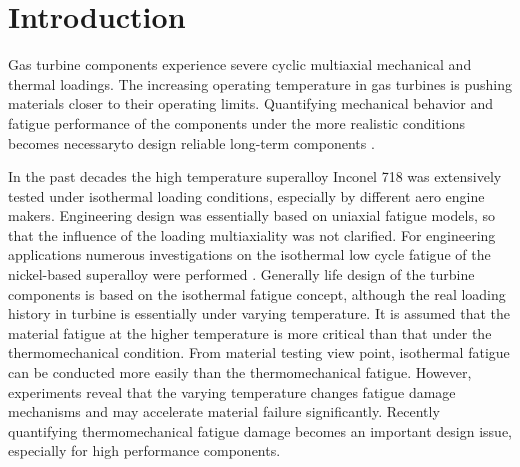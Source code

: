 

\section{Introduction}
\noindent
Gas turbine components experience severe cyclic multiaxial mechanical and thermal loadings. The increasing operating temperature in gas turbines is pushing materials closer to their operating limits. Quantifying mechanical behavior and fatigue performance of the components under the more realistic conditions becomes necessaryto design reliable long-term components  \cite{Harrison1996}.

In the past decades the high temperature superalloy Inconel 718 was extensively tested under isothermal loading conditions, especially by different aero engine makers. Engineering design was essentially based on uniaxial fatigue models, so that the influence of the loading multiaxiality was not clarified.
For engineering applications numerous investigations on the isothermal low cycle fatigue of the nickel-based superalloy were performed \cite{Koch85, Morrow88, Mahobia2014, Chen2016, William1995, kim1988elevated, nelson1992creep}. 
Generally life design of the turbine components is based on the isothermal fatigue concept, although the real loading history in turbine is essentially under varying temperature. It is assumed that the material fatigue at the higher temperature is more critical than that under the thermomechanical condition. From material testing view point, isothermal fatigue can be conducted more easily than the thermomechanical fatigue. However, experiments reveal that the varying temperature changes fatigue damage mechanisms and may accelerate material failure significantly. Recently quantifying thermomechanical fatigue damage becomes an important design issue, especially for high performance components.

